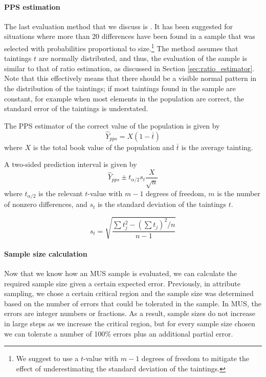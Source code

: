 \paragraph{PPS estimation} \label{par:pps_estimation}
The last evaluation method that we discuss is . 
It has been suggested for situations where more than 20 differences have been found in a sample that was selected with probabilities proportional to size.\footnote{We suggest to use a $t$-value with $m - 1$ degrees of freedom to mitigate the effect of underestimating the standard deviation of the taintings.} The method assumes that taintings $t$ are normally distributed, and thus, the evaluation of the sample is similar to that of ratio estimation, as discussed in Section \ref{sec:ratio_estimator}. Note that this effectively means that there should be a visible normal pattern in the distribution of the taintings; if most taintings found in the sample are constant, for example when most elements in the population are correct, the standard error of the taintings is understated.

\bigskip
The PPS estimator of the correct value of the population is given by
\begin{equation}
\hat{Y}_{pps} = X (1 - \bar{t})
\label{eq:pps_estimate}
\end{equation}
where $X$ is the total book value of the population and $\bar{t}$ is the average tainting. 

\bigskip
A two-sided prediction interval is given by
\begin{equation}
  \hat{Y}_{pps} \pm t_{\alpha/2} s_t \frac{X}{\sqrt{n}}
\label{eq:pred_interval_pps}
\end{equation}
where $t_{\alpha/2}$ is the relevant $t$-value with $m - 1$ degrees of freedom, $m$ is the number of nonzero differences, and $s_t$ is the standard deviation of the taintings $t$.

\begin{equation}
s_{t} = \sqrt{\frac{\sum{t_j^2} - (\sum{t_j})^2/n}{n - 1}}
\label{eq:sd_t}
\end{equation}

\paragraph{Sample size calculation} \label{par:sample_size_calculation}
Now that we know how an MUS sample is evaluated, we can calculate the required sample size given a certain expected error. Previously, in attribute sampling, we chose a certain critical region and the sample size was determined based on the number of errors that could be tolerated in the sample. In MUS, the errors are integer numbers or fractions. As a result, sample sizes do not increase in large steps as we increase the critical region, but for every sample size chosen we can tolerate a number of 100\% errors plus an additional partial error.

